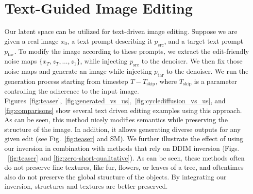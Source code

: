 
\vspace{-0.1cm}
\section{Text-Guided Image Editing} Our latent space can be utilized for text-driven image editing. 
\label{sec:text-guided}%
Suppose we are given a real image $x_0$, a text prompt describing it $p_{\text{src}}$, and a target text prompt $p_{\text{tar}}$. To modify the image according to these prompts, we extract the edit-friendly noise maps $\{x_T,z_T,\ldots,z_1\}$, while injecting $p_{\text{src}}$ to the denoiser. We then fix those noise maps and generate an image while injecting $p_{\text{tar}}$ to the denoiser. We run the generation process starting from timestep $T\!-\!T_{\text{skip}}$, where $T_{\text{skip}}$ is a parameter controlling the adherence to the input image.
Figures~\ref{fig:teaser},~\ref{fig:generated_vs_us},~\ref{fig:cyclediffusion_vs_us}, and \ref{fig:comparisons} show several text driven editing examples using this approach. As can be seen, this method nicely modifies semantics while preserving the structure of the image. In addition, it allows generating diverse outputs for any given edit (see Fig.~\ref{fig:teaser} and SM).
We further illustrate the effect of using our inversion in combination with methods that rely on DDIM inversion (Figs. ~\ref{fig:teaser} and \ref{fig:zero-short-qualitative}). As can be seen, these methods often do not preserve fine textures, like fur, flowers, or leaves of a tree, and oftentimes also do not preserve the global structure of the objects. By integrating our inversion, structures and textures are better preserved.

